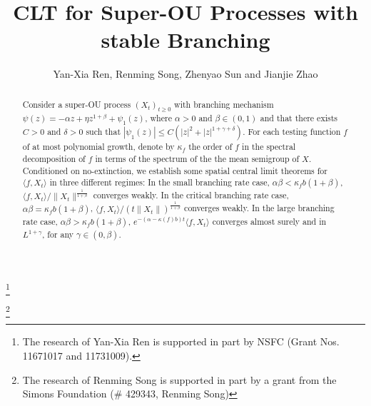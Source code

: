 \documentclass[12pt,a4paper]{amsart}
\theoremstyle{plain}
\theoremstyle{definition}
\numberwithin{equation}{section}
\begin{document}
\title
    [CLT for Super-OU processes]
    {\large CLT for Super-OU Processes with stable Branching}
\author
    [Y.-X. Ren, R. Song, Z. Sun and J. Zhao]
    {Yan-Xia Ren, Renming Song, Zhenyao Sun and Jianjie Zhao}
\address
    {Yan-Xia Ren\\
    School of Mathematical Sciences\\
    Peking University\\
    Beijing, P. R. China, 100871}
\thanks{The research of Yan-Xia Ren is supported in part by NSFC (Grant Nos. 11671017  and 11731009).}
\address
   {Renming Song\\
   Department of Mathematics\\
   University of Illinois\\
   Urbana, IL 61801, USA}
   \thanks{The research of Renming Song is supported in part by a grant from the Simons Foundation (\# 429343, Renming Song)}
\address
    {Zhenyao Sun\\
    School of Mathematical Sciences\\
    Peking University\\
    Beijing, P. R. China, 100871}
\address
    {Jianjie Zhao\\
    School of Mathematical Sciences\\
    Peking University\\
    Beijing, P. R. China, 100871}
\begin{abstract}
    Consider a super-OU process $(X_t)_{t\geq 0}$ with branching mechanism $\psi(z)=-\alpha z +\eta z^{1+\beta} + \psi_1(z)$, where $\alpha >0$ and $\beta\in (0,1)$ and that there exists $C >0$ and $\delta >0$ such that
$
    |\psi_1(z)| \leq C(|z|^2+|z|^{1+\gamma + \delta}). 
$
    For each testing function $f$ of at most polynomial growth, denote by $\kappa_f$ the order of $f$ in the spectral decomposition of $f$ in terms of the spectrum of the the mean semigroup of $X$.
    Conditioned on no-extinction, we establish some spatial central limit theorems for $\langle f, X_t \rangle$ in three different regimes: 
    In the small branching rate case, $\alpha\beta< \kappa_f b(1+\beta)$, $\langle f,X_t\rangle/\|X_t\|^{\frac{1}{1+\beta}}$ converges weakly.
    In the critical branching rate case, $\alpha\beta= \kappa_f b(1+\beta)$,  $\langle f,X_t\rangle/(t\|X_t\|)^{\frac{1}{1+\beta}}$ converges weakly.
    In the large branching rate case,  $\alpha\beta> \kappa_f b(1+\beta)$, $e^{-(\alpha-\kappa(f)b)t}\langle f,X_t\rangle$ converges almost surely and in $L^{1+\gamma}$, for any $\gamma \in (0,\beta)$.
\end{abstract}
\end{document}
